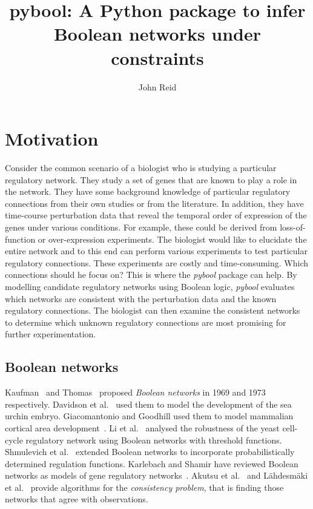 \documentclass{article}
\title{pybool: A Python package to infer Boolean networks under constraints}
\author{John Reid}
\begin{document}
\maketitle




\section{Motivation}

Consider the common scenario of a biologist who is studying a particular regulatory network. They study a set of genes that are known to play a role in the network. They have some background knowledge of particular regulatory connections from their own studies or from the literature. In addition, they have time-course perturbation data that reveal the temporal order of expression of the genes under various conditions. For example, these could be derived from loss-of-function or over-expression experiments. The biologist would like to elucidate the entire network and to this end can perform various experiments to test particular regulatory connections. These experiments are costly and time-consuming. Which connections should he focus on? This is where the \emph{pybool} package can help. By modelling candidate regulatory networks using Boolean logic, \emph{pybool} evaluates which networks are consistent with the perturbation data and the known regulatory connections. The biologist can then examine the consistent networks to determine which unknown regulatory connections are most promising for further experimentation.



\subsection{Boolean networks}
Kaufman~\cite{Kauffman1969} and Thomas~\cite{Thomas1973} proposed \emph{Boolean networks} in 1969 and 1973 respectively. Davidson et al.~\cite{Davidson2002} used them to model the development of the sea urchin embryo. Giacomantonio and Goodhill used them to model mammalian cortical area development~\cite{Giacomantonio2010}. Li et al.~\cite{Li2004} analysed the robustness of the yeast cell-cycle regulatory network using Boolean networks with threshold functions. Shmulevich et al.~\cite{Shmulevich2002} extended Boolean networks to incorporate probabilistically determined regulation functions. Karlebach and Shamir have reviewed Boolean networks as models of gene regulatory networks~\cite{Karlebach2008}. Akutsu et al.~\cite{Akutsu1999} and L\"{a}hdesm\"{a}ki et al.~\cite{Lahdesmaki2003} provide algorithms for the \emph{consistency problem}, that is finding those networks that agree with observations.
\end{document}
